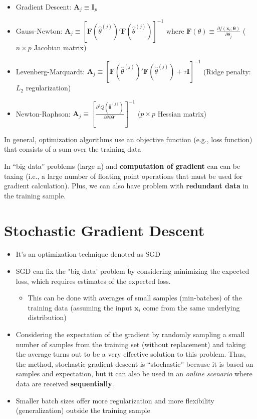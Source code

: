\documentclass[
]{book}
\providecommand{\tightlist}{%
  \setlength{\itemsep}{0pt}\setlength{\parskip}{0pt}}
\begin{document}
\begin{itemize}
\item
  Gradient Descent: \(\mathbf{A}_j \equiv \mathbf{I}_p\)
\item
  Gauss-Newton: \(\mathbf{A}_j \equiv [\mathbf{F}( \hat{\theta}^{(j)})' \mathbf{F}( \hat{\theta}^{(j)})]^{-1}\) where \(\mathbf{F} (\theta) \equiv \frac{\partial f(\mathbf{x}_i; \mathbf{\theta})}{\partial \theta_j}\) (\(n \times p\) Jacobian matrix)
\item
  Levenberg-Marquardt: \(\mathbf{A}_j \equiv [\mathbf{F}( \hat{\theta}^{(j)})' \mathbf{F}( \hat{\theta}^{(j)}) + \tau \mathbf{I}]^{-1}\) (Ridge penalty: \(L_2\) regularization)
\item
  Newton-Raphson: \(\mathbf{A}_j \equiv [\frac{\partial^2 Q (\hat{\mathbf{\theta}}^{(j)})}{\partial \theta \partial \mathbf{\theta}'}]^{-1}\) (\(p \times p\) Hessian matrix)
\end{itemize}

In general, optimization algorithms use an objective function (e.g., loss function) that consists of a sum over the training data

In ``big data'' problems (large n) and \textbf{computation of gradient} can can be taxing (i.e., a large number of floating point operations that must be used for gradient calculation). Plus, we can also have problem with \textbf{redundant data} in the training sample.

\hypertarget{stochastic-gradient-descent}{%
\section{Stochastic Gradient Descent}\label{stochastic-gradient-descent}}

\begin{itemize}
\item
  It's an optimization technique denoted as SGD
\item
  SGD can fix the "big data' problem by considering minimizing the expected loss, which requires estimates of the expected loss.

  \begin{itemize}
  \tightlist
  \item
    This can be done with averages of small samples (min-batches) of the training data (assuming the input \(\mathbf{x}_i\) come from the same underlying distribution)
  \end{itemize}
\item
  Considering the expectation of the gradient by randomly sampling a small number of samples from the training set (without replacement) and taking the average turns out to be a very effective solution to this problem. Thus, the method, stochastic gradient descent is ``stochastic'' because it is based on samples and expectation, but it can also be used in an \emph{online scenario} where data are received \textbf{sequentially}.
\item
  Smaller batch sizes offer more regularization and more flexibility (generalization) outside the training sample
\end{itemize}
\end{document}
